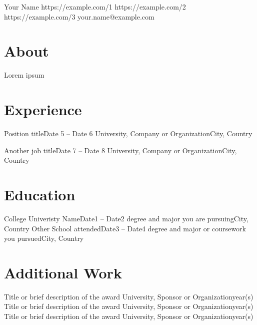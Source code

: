 \documentclass[a4paper,11pt]{article}
\begin{document}
\resumetitle
{Your Name}
{https://example.com/1}
{https://example.com/2}
{https://example.com/3}
{your.name@example.com}

\section{About}
Lorem ipsum

\section{Experience}
\resumeStructuredListStart

\resumeStructuredItem
{Position title}{Date 5 -- Date 6}
{University, Company or Organization}{City, Country}
\resumeItemListStart
{}
\resumeItemListEnd

\resumeStructuredItem
{Another job title}{Date 7 -- Date 8}
{University, Company or Organization}{City, Country}
\resumeItemListStart
{}
\resumeItemListEnd

\resumeStructuredListEnd

\section{Education}
\resumeStructuredListStart

\resumeStructuredItem
{College Univeristy Name}{Date1 -- Date2}
{degree and major you are pursuing}{City, Country}
\resumeStructuredItem
{Other School attended}{Date3 -- Date4}
{degree and major or coursework you pursued}{City, Country}

\resumeStructuredListEnd

\section{Additional Work}
\resumeStructuredListStart
\resumeStructuredItem
{Title or brief description of the award}{}
{University, Sponsor or Organization}{year(s)}
\resumeStructuredItem
{Title or brief description of the award}{}
{University, Sponsor or Organization}{year(s)}
\resumeStructuredItem
{Title or brief description of the award}{}
{University, Sponsor or Organization}{year(s)}
\resumeStructuredListEnd
\end{document}
